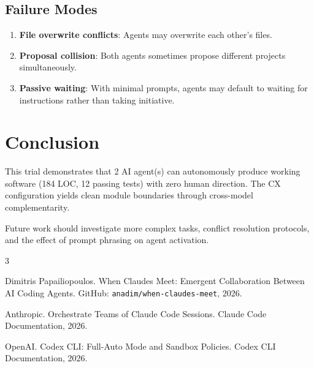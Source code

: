 \documentclass[11pt,a4paper]{article}
\begin{document}
\subsection{Failure Modes}

\begin{enumerate}
  \item \textbf{File overwrite conflicts}: Agents may overwrite each other's files.
  \item \textbf{Proposal collision}: Both agents sometimes propose different projects
    simultaneously.
  \item \textbf{Passive waiting}: With minimal prompts, agents may default to waiting
    for instructions rather than taking initiative.
\end{enumerate}

\section{Conclusion}

This trial demonstrates that 2 AI agent(s) can autonomously
produce working software (184 LOC, 12 passing tests) with zero human direction. The CX configuration yields clean module boundaries through cross-model complementarity.

Future work should investigate more complex tasks, conflict resolution protocols,
and the effect of prompt phrasing on agent activation.


\begin{thebibliography}{3}

Dimitris Papailiopoulos.
\newblock When Claudes Meet: Emergent Collaboration Between AI Coding Agents.
\newblock GitHub: \texttt{anadim/when-claudes-meet}, 2026.

Anthropic.
\newblock Orchestrate Teams of Claude Code Sessions.
\newblock Claude Code Documentation, 2026.

OpenAI.
\newblock Codex CLI: Full-Auto Mode and Sandbox Policies.
\newblock Codex CLI Documentation, 2026.

\end{thebibliography}

\appendix
\end{document}
